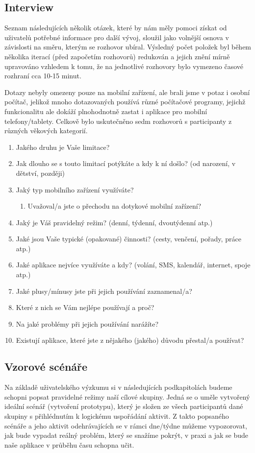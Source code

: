 \documentclass[thesis=M,czech]{FITthesis}[2012/06/26]
\begin{document}
\subsection{Interview}
Seznam následujících několik otázek, které by nám měly pomoci získat od uživatelů potřebné informace pro další vývoj, sloužil jako volnější osnova v závislosti na směru, kterým se rozhovor ubíral. Výsledný počet položek byl během několika iterací (před započetím rozhovorů) redukován a jejich znění mírně upravováno vzhledem k tomu, že na jednotlivé rozhovory bylo vymezeno časové rozhraní cca 10-15 minut.

Dotazy nebyly omezeny pouze na mobilní zařízení, ale brali jsme v potaz i osobní počítač, jelikož mnoho dotazovaných používá různé počítačové programy, jejichž funkcionalitu ale dokáží plnohodnotně zastat i aplikace pro mobilní telefony/tablety. Celkově bylo uskutečněno sedm rozhovorů s participanty z různých věkových kategorií.

\begin{enumerate}
\item Jakého druhu je Vaše limitace?
\item Jak dlouho se s touto limitací potýkáte a kdy k ní došlo? (od narození, v dětství, později)
\item Jaký typ mobilního zařízení využíváte?
\begin{enumerate}
\item Uvažoval/a jste o přechodu na dotykové mobilní zařízení?
\end{enumerate}
\item Jaký je Váš pravidelný režim? (denní, týdenní, dvoutýdenní atp.)
\item Jaké jsou Vaše typické (opakované) činnosti? (cesty, venčení, pořady, práce atp.)
\item Jaké aplikace nejvíce využíváte a kdy? (volání, SMS, kalendář, internet, spoje atp.)
\item Jaké plusy/mínusy jste při jejich používání zaznamenal/a?
\item Které z nich se Vám nejlépe používají a proč?
\item Na jaké problémy při jejich používání narážíte?
\item Existují aplikace, které jste z nějakého (jakého) důvodu přestal/a používat?
\end{enumerate}

\subsection{Vzorové scénáře}
Na základě uživatelského výzkumu si v následujících podkapitolách budeme schopni popsat pravidelné režimy naší cílové skupiny. Jedná se o uměle vytvořený ideální scénář (vytvoření prototypu), který je složen ze všech participantů dané skupiny s přihlédnutím k logickému uspořádání aktivit. Z takto popsaného scénáře a jeho aktivit odehrávajících se v rámci dne/týdne můžeme vypozorovat, jak bude vypadat reálný problém, který se snažíme pokrýt, v praxi a jak se bude naše aplikace v průběhu času schopna učit.
\end{document}
